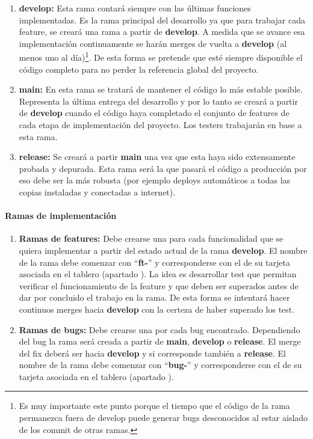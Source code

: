\begin{enumerate}
	\renewcommand{\labelenumi}{\alph{enumi}.}
	\item \textbf{develop:} Esta rama contará siempre con las últimas funciones implementadas. Es la rama principal del desarrollo ya que para trabajar cada feature, se creará una rama a partir de \textbf{develop}. A medida que se avance esa implementación continuamente se harán merges de vuelta a \textbf{develop} (al menos uno al día)\footnote{Es muy importante este punto porque el tiempo que el código de la rama permanezca fuera de develop puede generar bugs desconocidos al estar aislado de los commit de otras ramas.}. De esta forma se pretende que esté siempre disponible el código completo para no perder la referencia global del proyecto. 
	
	\item \textbf{main:} En esta rama se tratará de mantener el código lo más estable posible. Representa la última entrega del desarrollo y por lo tanto se creará a partir de \textbf{develop} cuando el código haya completado el conjunto de features de cada etapa de implementación del proyecto. Los testers trabajarán en base a esta rama. 
	
	\item \textbf{release:} Se creará a partir \textbf{main} una vez que esta haya sido extensamente probada y depurada. Esta rama será la que pasará el código a producción por eso debe ser la más robusta (por ejemplo deploys automáticos a todas las copias instaladas y conectadas a internet).
\end{enumerate}

\paragraph{Ramas de implementación}\label{pg:ramas-de-implementacion}
\begin{enumerate}
	\renewcommand{\labelenumi}{\alph{enumi}.}
	\item \textbf{Ramas de features:} Debe crearse una para cada funcionalidad que se quiera implementar a partir del estado actual de la rama \textbf{develop}. El nombre de la rama debe comenzar con “\textbf{ft-}” y corresponderse con el de su tarjeta asociada en el tablero (apartado ). La idea es desarrollar test que permitan verificar el funcionamiento de la feature y que deben ser superados antes de dar por concluido el trabajo en la rama. De esta forma se intentará hacer continuos merges hacia \textbf{develop} con la certeza de haber superado los test.
	
	\item \textbf{Ramas de bugs:} Debe crearse una por cada bug encontrado. Dependiendo del bug la rama será creada a partir de \textbf{main}, \textbf{develop} o \textbf{release}. El merge del fix deberá ser hacia \textbf{develop} y si corresponde también a \textbf{release}. El nombre de la rama debe comenzar con “\textbf{bug-}” y corresponderse con el de su tarjeta asociada en el tablero (apartado ).
\end{enumerate}

